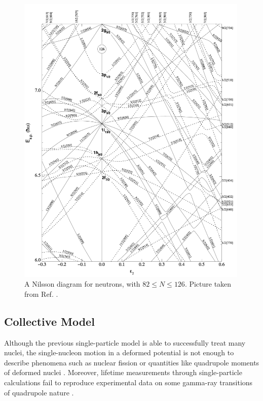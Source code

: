 \begin{figure}
    \centering
    \includegraphics[width=0.99\textwidth]{Chapters/Figures/nillson_diagram_2.png}
    \caption{A Nilsson diagram for neutrons, with $82\leq N\leq126$. Picture taken from Ref. \cite{ragnarsson2005shapes}.}
    \label{nillson-diagram-2}
\end{figure}

\pagebreak

\subsection{Collective Model}

Although the previous single-particle model is able to successfully treat many nuclei, the single-nucleon motion in a deformed potential is not enough to describe phenomena such as nuclear fission or quantities like quadrupole moments of deformed nuclei \cite{townes1949nuclear}. Moreover, lifetime measurements through single-particle calculations fail to reproduce experimental data on some gamma-ray transitions of quadrupole nature \cite{goldhaber1951classification}.

